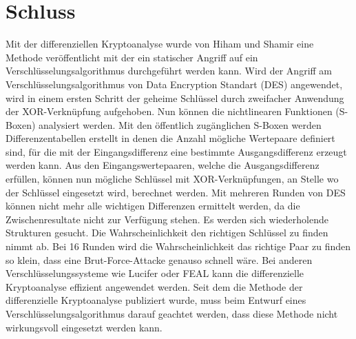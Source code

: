 \section{Schluss}\label{sec:Schluss}
Mit der differenziellen Kryptoanalyse wurde von Hiham und Shamir eine Methode veröffentlicht mit der ein statischer Angriff auf ein Verschlüsselungsalgorithmus durchgeführt werden kann. 
Wird der Angriff am Verschlüsselungsalgorithmus von Data Encryption Standart (DES) angewendet, wird in einem ersten Schritt der geheime Schlüssel durch zweifacher Anwendung der XOR-Verknüpfung aufgehoben. Nun können die nichtlinearen Funktionen (S-Boxen) analysiert werden. 
Mit den öffentlich zugänglichen S-Boxen werden Differenzentabellen erstellt in denen die Anzahl mögliche Wertepaare definiert sind, für die mit der Eingangsdifferenz eine bestimmte Ausgangsdifferenz erzeugt werden kann. 
Aus den Eingangswertepaaren, welche die Ausgangsdifferenz erfüllen, können nun mögliche Schlüssel mit XOR-Verknüpfungen, an Stelle wo der Schlüssel eingesetzt wird, berechnet werden. Mit mehreren Runden von DES können nicht mehr alle wichtigen Differenzen ermittelt werden, da die Zwischenresultate nicht zur Verfügung stehen. Es werden sich wiederholende Strukturen gesucht. Die Wahrscheinlichkeit den richtigen Schlüssel zu finden nimmt ab. Bei 16 Runden wird die Wahrscheinlichkeit das richtige Paar zu finden so klein, dass eine Brut-Force-Attacke genauso schnell wäre. Bei anderen Verschlüsselungssysteme wie Lucifer oder FEAL kann die differenzielle Kryptoanalyse effizient angewendet werden. Seit dem die Methode der differenzielle Kryptoanalyse publiziert wurde, muss beim Entwurf eines Verschlüsselungsalgorithmus darauf geachtet werden, dass diese Methode nicht wirkungsvoll eingesetzt werden kann.









